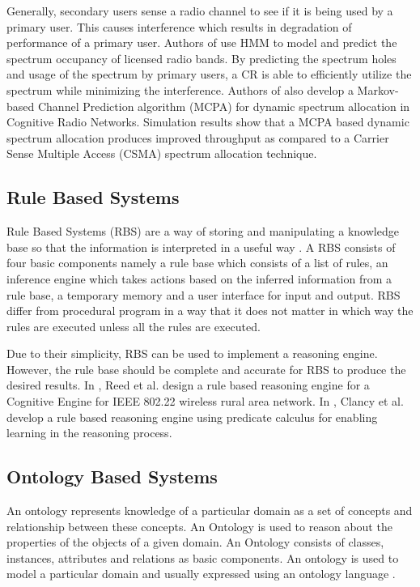 \documentclass[conference]{IEEEtran}
\begin{document}
    Generally, secondary users sense a radio channel to see if it is being used by a primary user. This causes interference which results in degradation of performance of a primary user. Authors of \cite{14} use HMM to model and predict the spectrum occupancy of licensed radio bands. By predicting the spectrum holes and usage of the spectrum by primary users, a CR is able to efficiently utilize the spectrum while minimizing the interference. Authors of \cite{14} also develop a Markov-based Channel Prediction algorithm (MCPA) for dynamic spectrum allocation in Cognitive Radio Networks. Simulation results show that a MCPA based dynamic spectrum allocation produces improved throughput as compared to a Carrier Sense Multiple Access (CSMA) spectrum allocation technique. 

\subsection{Rule Based Systems}
	Rule Based Systems (RBS) are a way of storing and manipulating a knowledge base so that the information is interpreted in a useful way \cite{5}. A RBS consists of four basic components namely a rule base which consists of a list of rules, an inference engine which takes actions based on the inferred information from a rule base, a temporary memory and a user interface for input and output. RBS differ from procedural program in a way that it does not matter in which way the rules are executed unless all the rules are executed.

    Due to their simplicity, RBS can be used to implement a reasoning engine. However, the rule base should be complete and accurate for RBS to produce the desired results. In \cite{15}, Reed et al. design a rule based reasoning engine for a Cognitive Engine for IEEE 802.22 wireless rural area network. In \cite{4}, Clancy et al. develop a rule based reasoning engine using predicate calculus for enabling learning in the reasoning process.

\subsection{Ontology Based Systems}
	An ontology represents knowledge of a particular domain as a set of concepts and relationship between these concepts. An Ontology is used to reason about the properties of the objects of a given domain. An Ontology consists of classes, instances, attributes and relations as basic components. An ontology is used to model a particular domain and usually expressed using an ontology language \cite{3}.
\end{document}
